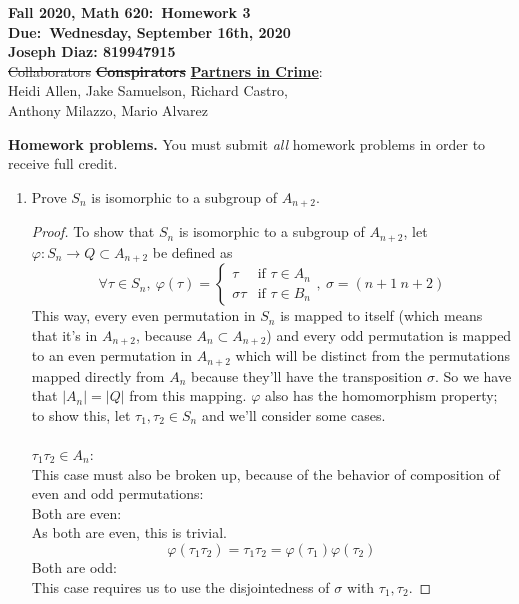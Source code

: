 \documentclass{article}
\newcommand{\abs}[1]{\left|#1\right|}
\newcommand{\parens}[1]{\left(#1\right)}
\begin{document}
	\begin{center}
		\textbf{Fall 2020, Math 620:\ Homework 3} \\
		\textbf{Due:\ Wednesday, September 16th, 2020} \\
		\textbf{Joseph Diaz: 819947915}\\
		\st{Collaborators} \st{\textbf{Conspirators}}
		\underline{\textbf{Partners in Crime}}:\\
		Heidi Allen, Jake Samuelson, Richard Castro,\\ 
		Anthony Milazzo, Mario Alvarez


\end{center}
\bigskip
\noindent
\textbf{Homework problems.}
You must submit \emph{all} homework problems in order to receive full 
credit.  
\noindent\makebox[\linewidth]{\rule{\paperwidth}{0.4pt}}
\begin{enumerate}[(H1)]
\item 
Prove $S_n$ is isomorphic to a subgroup of $A_{n+2}$.  
\begin{proof}
To show that $S_n$ is isomorphic to a subgroup of $A_{n+2}$, let
$\varphi: S_n \to Q \subset A_{n+2}$ be defined as
$$\forall \tau \in S_n,\ 
\varphi\parens{\tau} = \left\{\begin{array}{cc}
\tau & \text{if }\tau \in A_n \\
\sigma\tau & \text{if }\tau \in B_n
\end{array}\right.,\ \sigma = \parens{n+1\ n+2}$$
This way, every even permutation in $S_n$ is mapped to itself 
(which means that it's in $A_{n+2}$, because $A_n \subset A_{n+2}$)
and every odd permutation is mapped to an even permutation
in $A_{n+2}$ which will be distinct from the permutations mapped
directly from $A_n$ because they'll have the transposition $\sigma$.
So we have that $\abs{A_n} = \abs{Q}$ from this mapping. $\varphi$
also has the homomorphism property; to show this, let 
$\tau_1,\tau_2 \in S_n$ and we'll consider some cases.\\\\
$\tau_1\tau_2 \in A_n$:\\
This case must also be broken up, because of the behavior of
composition of even and odd permutations:\\
Both are even:\\
As both are even, this is trivial.
$$\varphi\parens{\tau_1\tau_2} = \tau_1\tau_2 =
\varphi\parens{\tau_1}\varphi\parens{\tau_2}$$ 
Both are odd:\\
This case requires us to use the 
disjointedness of $\sigma$ with $\tau_1, \tau_2$.

\end{proof}
\end{enumerate}
\end{document}
